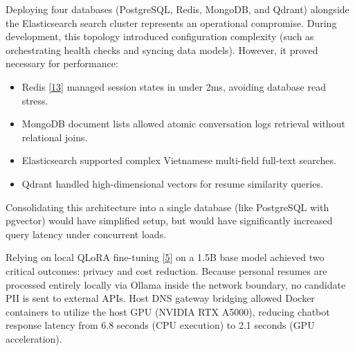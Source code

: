 \documentclass[12pt, a4paper]{report}
\begin{document}
\vspace{0.4cm}
Deploying four databases (PostgreSQL, Redis, MongoDB, and Qdrant) alongside the Elasticsearch search cluster represents an operational compromise. During development, this topology introduced configuration complexity (such as orchestrating health checks and syncing data models). However, it proved necessary for performance:
\begin{itemize}
    \item Redis [\hyperlink{cite13}{13}] managed session states in under 2ms, avoiding database read stress.
    \item MongoDB document lists allowed atomic conversation logs retrieval without relational joins.
    \item Elasticsearch supported complex Vietnamese multi-field full-text searches.
    \item Qdrant handled high-dimensional vectors for resume similarity queries.
\end{itemize}
Consolidating this architecture into a single database (like PostgreSQL with pgvector) would have simplified setup, but would have significantly increased query latency under concurrent loads.

\vspace{0.4cm}
Relying on local QLoRA fine-tuning [\hyperlink{cite5}{5}] on a 1.5B base model achieved two critical outcomes: privacy and cost reduction. Because personal resumes are processed entirely locally via Ollama inside the network boundary, no candidate PII is sent to external APIs. Host DNS gateway bridging allowed Docker containers to utilize the host GPU (NVIDIA RTX A5000), reducing chatbot response latency from 6.8 seconds (CPU execution) to 2.1 seconds (GPU acceleration).

\vspace{0.8cm}
\vspace{0.4cm}
\end{document}
